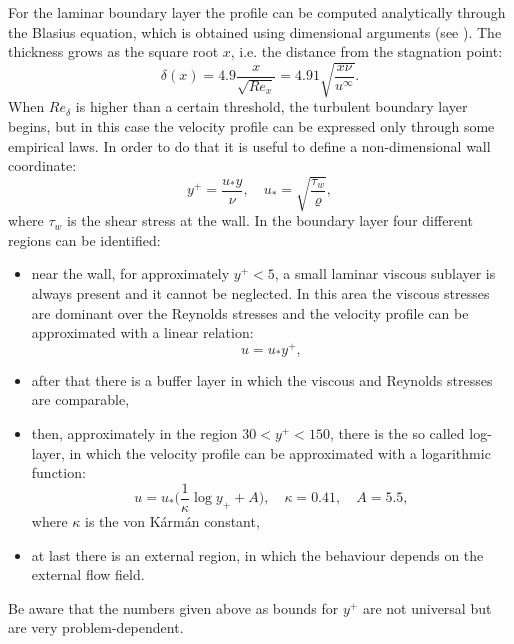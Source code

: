 For the laminar boundary layer the profile can be computed analytically 
through the Blasius equation, which is obtained using dimensional arguments (see \cite{bl:schlichting}). 
The thickness grows as the square root $x$, i.e. the distance from the stagnation point:
\begin{equation}
\delta(x) = 4.9 \frac{x}{\sqrt{Re_x}} = 4.91\sqrt{\frac{x 
		\nu}{u^\infty}}.
\end{equation}
When $Re_\delta$ is higher than a certain threshold, the turbulent boundary 
layer begins, but in this case the velocity profile can be expressed only 
through some empirical laws. In order to do that it is useful to define a 
non-dimensional wall coordinate:
\begin{equation}
y^+ = \frac{u_* y}{\nu}, \quad u_* = \sqrt{\frac{\tau_w}{\varrho}},
\end{equation}
where $\tau_w$ is the shear stress at the wall. In the boundary layer four 
different regions can be identified:
\begin{itemize}
	\item near the wall, for approximately $y^+ < 5$, a small laminar viscous 
	sublayer is 
	always present and it cannot be neglected. In this area the viscous 
	stresses are dominant over the Reynolds stresses and the velocity profile 
	can be approximated with a linear relation:
	\begin{equation}
	u = u_* y^+,
	\end{equation}
	\item after that there is a buffer layer in which the viscous and Reynolds 
	stresses are comparable,
	\item then, approximately in the region $30 < y^+ < 150$, there is the so 
	called log-layer, in which the velocity profile can be approximated with a 
	logarithmic function:
	\begin{equation} \label{eq:loglaw}
	u = u_* \bigg( \frac{1}{\kappa} \log y_+ + A\bigg), \quad \kappa=0.41, 
	\quad A = 
	5.5,
	\end{equation}
	where $\kappa$ is the von K\'arm\'an constant,
	\item at last there is an external region, in which the behaviour depends 
	on the external flow field.	
\end{itemize}
Be aware that the numbers given above as bounds for $y^+$ are not universal but 
are very problem-dependent.
